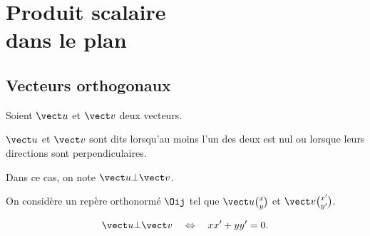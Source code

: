 \documentclass[10pt,openright,twoside,french]{book}
\begin{document}
\chapter[Produit scalaire dans le plan]{Produit scalaire\\ dans le plan}\label{produit_scalaire}

\section{Vecteurs orthogonaux}

\begin{Defi}
    Soient $\vect u$ et $\vect v$ deux vecteurs.\par
    $\vect u$ et $\vect v$ sont dits  lorsqu'au moins l'un des deux est nul ou lorsque leurs directions sont perpendiculaires.\par
    Dans ce cas, on note $\vect u \bot \vect v$.
    
    \begin{center}
    \end{center}
\end{Defi}

\begin{Prop}
    On considère un repère orthonormé $\Oij$ tel que $\vect u\binom x y$ et $\vect v \binom{x'}{y'}$.\par
    \[\vect u \bot \vect v \quad \Leftrightarrow \quad xx' + yy' = 0.\]
\end{Prop}
\end{document}
